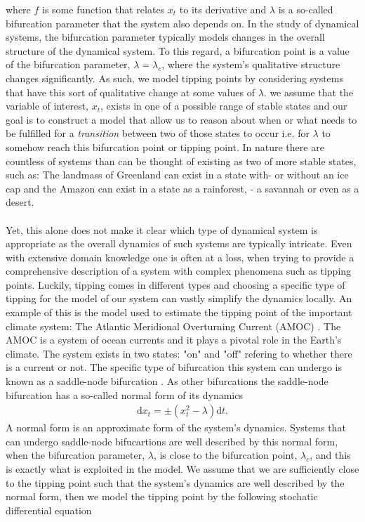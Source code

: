 where $f$ is some function that relates $x_t$ to its derivative and $\lambda$ is a so-called bifurcation parameter that the system also depends on. In the study of dynamical systems, the bifurcation parameter typically models changes in the overall structure of the dynamical system. To this regard, a bifurcation point is a value of the bifurcation parameter, $\lambda = \lambda_c$, where the system's qualitative structure changes significantly. As such, we model tipping points by considering systems that have this sort of qualitative change at some values of $\lambda$. we assume that the variable of interest, $x_t$, exists in one of a possible range of stable states and our goal is to construct a model that allow us to reason about when or what needs to be fulfilled for a \textit{transition} between two of those states to occur i.e. for $\lambda$ to somehow reach this bifurcation point or tipping point. In nature there are countless of systems than can be thought of existing as two of more stable states, such as: The landmass of Greenland can exist in a state with- or without an ice cap and the Amazon can exist in a state as a rainforest, - a savannah or even as a desert. \\\\
Yet, this alone does not make it clear which type of dynamical system is appropriate as the overall dynamics of such systems are typically intricate. Even with extensive domain knowledge one is often at a loss, when trying to provide a comprehensive description of a system with complex phenomena such as tipping points. Luckily, tipping comes in different types and choosing a specific type of tipping for the model of our system can vastly simplify the dynamics locally. An example of this is the model used to estimate the tipping point of the important climate system: The Atlantic Meridional Overturning Current (AMOC) \cite{Ditlevsen2023}. The AMOC is a system of ocean currents and it plays a pivotal role in the Earth's climate. The system exists in two states: "on" and "off" refering to whether there is a current or not. The specific type of bifurcation this system can undergo is known as a saddle-node bifurcation \cite{Ditlevsen2023}\cite{Strogatz2019_gv}. As other bifurcations the saddle-node bifurcation has a so-called normal form of its dynamics 
\begin{align}
    \mathrm{d}x_t = \pm\left(x_t^2 - \lambda\right)\mathrm{d}t. \label{eq:normalFormIntroduction}
\end{align}
A normal form is an approximate form of the system's dynamics. Systems that can undergo saddle-node bifucartions are well described by this normal form, when the bifurcation parameter, $\lambda$, is close to the bifurcation point, $\lambda_c$, and this is exactly what is exploited in the model. We assume that we are sufficiently close to the tipping point such that the system's dynamics are well described by the normal form, then we model the tipping point by the following stochatic differential equation
